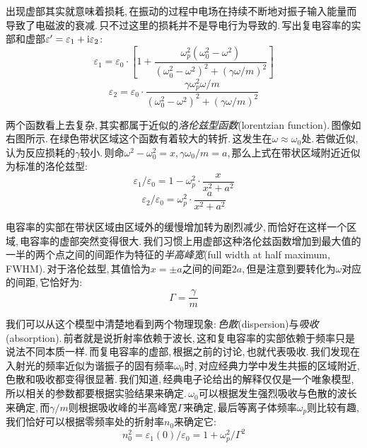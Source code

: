 出现虚部其实就意味着损耗,\,在振动的过程中电场在持续不断地对振子输入能量而导致了电磁波的衰减.\,只不过这里的损耗并不是导电行为导致的.\,写出复电容率的实部和虚部$\varepsilon'=\varepsilon_1+{\rm i}\varepsilon_2$:
\[\varepsilon_1=\varepsilon_0\cdot\left[1+\frac{\omega_p^2(\omega_0^2-\omega^2)}{(\omega_0^2-\omega^2)^2+(\gamma\omega/m)^2}\right]\]
\[\varepsilon_2=\varepsilon_0\cdot\frac{\gamma\omega_p^2\omega/m}{(\omega_0^2-\omega^2)^2+(\gamma\omega/m)^2}\]

两个函数看上去复杂,\,其实都属于近似的\emph{洛伦兹型函数}(lorentzian function).\,图像如右图所示.\,在绿色带状区域这个函数有着较大的转折.\,这发生在$\omega\approx \omega_0$处.\,若做近似,\,认为反应损耗的$\gamma$较小.\,则命$\omega^2-\omega_0^2=x$,\,$\gamma\omega_0/m=a$,\,那么上式在带状区域附近近似为标准的洛伦兹型:
\[\varepsilon_1/\varepsilon_0=1-\omega_p^2\cdot \frac{x}{x^2+a^2}\]
\[\varepsilon_2/\varepsilon_0=\omega_p^2\cdot\frac{a}{x^2+a^2}\]

电容率的实部在带状区域由区域外的缓慢增加转为剧烈减少,\,而恰好在这样一个区域,\,电容率的虚部突然变得很大.\,我们习惯上用虚部这种洛伦兹函数增加到最大值的一半的两个点之间的间距作为特征的\emph{半高峰宽}(full width at half maximum,\,FWHM).\,对于洛伦兹型,\,其值恰为$x=\pm a$之间的间距$2a$,\,但是注意到要转化为$\omega$对应的间距,\,它恰好为:
\[\Gamma=\frac{\gamma}{m}\]

我们可以从这个模型中清楚地看到两个物理现象:\,\emph{色散}(dispersion)与\emph{吸收}(absorption).\,前者就是说折射率依赖于波长,\,这和复电容率的实部依赖于频率只是说法不同本质一样.\,而复电容率的虚部,\,根据之前的讨论,\,也就代表吸收.\,我们发现在入射光的频率近似为谐振子的固有频率$\omega_0$时,\,对应经典力学中发生共振的区域附近,\,色散和吸收都变得很显著.\,我们知道,\,经典电子论给出的解释仅仅是一个唯象模型,\,所以相关的参数都要根据实验结果来确定.\,$\omega_0$可以根据发生强烈吸收与色散的波长来确定,\,而$\gamma/m$则根据吸收峰的半高峰宽$\Gamma$来确定,\,最后等离子体频率$\omega_p$则比较有趣,\,我们恰好可以根据零频率处的折射率$n_0$来确定它:
\[n_0^2=\varepsilon_1(0)/\varepsilon_0=1+\omega_p^2/\Gamma^2\]


